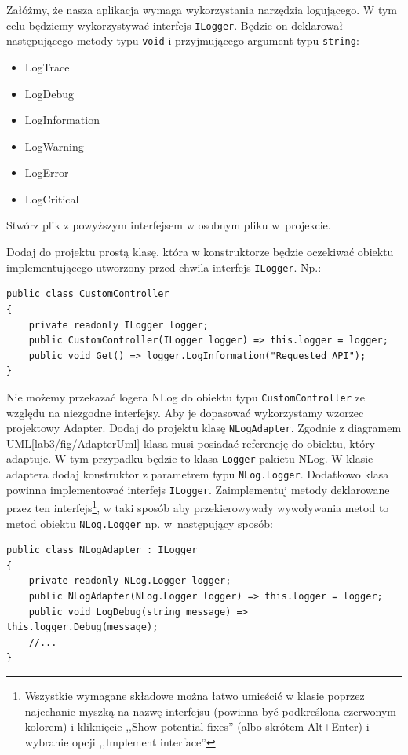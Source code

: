 Załóżmy, że nasza aplikacja wymaga wykorzystania narzędzia logującego. W tym celu będziemy wykorzystywać interfejs \texttt{ILogger}. Będzie on deklarował następującego metody typu \texttt{void} i przyjmującego argument typu \texttt{string}:
\begin{itemize}
	\item LogTrace
	\item LogDebug
	\item LogInformation
	\item LogWarning
	\item LogError
	\item LogCritical
\end{itemize}
Stwórz plik z powyższym interfejsem w osobnym pliku w~projekcie. 

Dodaj do projektu prostą klasę, która w konstruktorze będzie oczekiwać obiektu implementującego utworzony przed chwila interfejs \texttt{ILogger}. Np.:
\begin{lstlisting}[caption={Przykład klasy wykorzystującej obiekt implementujący \texttt{ILogger}}, label={lab3/lst/customControllerWithLogger}]
public class CustomController
{
	private readonly ILogger logger;
	public CustomController(ILogger logger) => this.logger = logger;
	public void Get() => logger.LogInformation("Requested API");
}
\end{lstlisting}

Nie możemy przekazać logera NLog do obiektu typu \texttt{CustomController} ze względu na niezgodne interfejsy. Aby je dopasować wykorzystamy wzorzec projektowy Adapter. Dodaj do projektu klasę \texttt{NLogAdapter}. Zgodnie z diagramem UML\ref{lab3/fig/AdapterUml} klasa musi posiadać referencję do obiektu, który adaptuje. W tym przypadku będzie to klasa \texttt{Logger} pakietu NLog. W klasie adaptera dodaj konstruktor z parametrem typu \texttt{NLog.Logger}. Dodatkowo klasa powinna implementować interfejs \texttt{ILogger}. Zaimplementuj metody deklarowane przez ten interfejs\footnote{Wszystkie wymagane składowe można łatwo umieścić w klasie poprzez najechanie myszką na nazwę interfejsu (powinna być podkreślona czerwonym kolorem) i kliknięcie ,,Show potential fixes'' (albo skrótem Alt+Enter) i wybranie opcji ,,Implement interface''}, w taki sposób aby przekierowywały wywoływania metod to metod obiektu \texttt{NLog.Logger} np. w~następujący sposób:
\begin{lstlisting}[caption={Fragment klasy adaptera dla pakietu NLog}, label={lab3/lst/nlogAdapter}]
 public class NLogAdapter : ILogger
{
	private readonly NLog.Logger logger;	
	public NLogAdapter(NLog.Logger logger) => this.logger = logger;	
	public void LogDebug(string message) => this.logger.Debug(message);	
	//...
}
\end{lstlisting}

